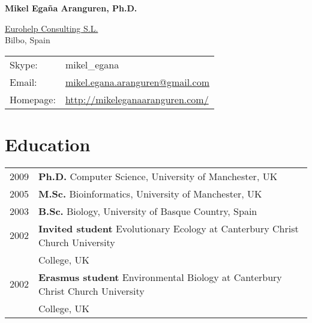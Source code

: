 \documentclass[11pt,fullpage]{article}
\newcommand{\etc}{\emph{etc.}}
\def\name{Mikel Ega\~na Aranguren, Ph.D.}
\begin{document}


\centerline{\Large \bf \name}

\vspace{0.25in}

\begin{minipage}{0.50\linewidth}
    \href{http://eurohelp.es/}{Eurohelp Consulting S.L.} \\
    Bilbo, Spain \\

\end{minipage}
\begin{minipage}{0.50\linewidth}
  \begin{tabular}{ll}
    Skype: & mikel\_egana \\
    Email: & \href{mailto:mikel.egana.aranguren@gmail.com}{mikel.egana.aranguren@gmail.com} \\
    Homepage: & \href{http://mikeleganaaranguren.com/}{http://mikeleganaaranguren.com/} 
    
  \end{tabular}
\end{minipage}

\section*{Education}

\begin{tabular}{ll} 
	2009 & {\bf Ph.D.} Computer Science, University of Manchester, UK \\
	2005 & {\bf M.Sc.} Bioinformatics, University of Manchester, UK \\
	2003 & {\bf B.Sc.} Biology, University of Basque Country, Spain \\
	2002 & {\bf Invited student} Evolutionary Ecology at Canterbury Christ Church University \\ 
	     & College, UK \\
	2002 & {\bf Erasmus student} Environmental Biology at Canterbury Christ Church University \\ 
	     & College, UK \\
\end{tabular}
\end{document}
